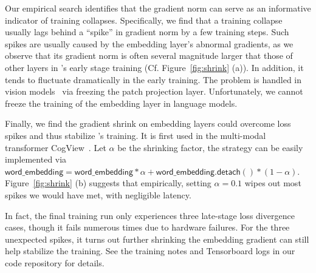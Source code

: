 Our empirical search identifies that the gradient norm can serve as an informative indicator of training collapses. %
Specifically, we find that 
a training collapse usually lags behind a ``spike'' in gradient norm by a few training steps. %
Such spikes are usually caused by the embedding layer's abnormal gradients, as we observe that its gradient norm is often several magnitude larger that those of other layers in \glm's early stage training (Cf. Figure~\ref{fig:shrink} (a)). 
In addition, it tends to fluctuate dramatically in the early training. 
The problem is handled in vision models~\citep{chen2021empirical} via freezing the patch projection layer. 
Unfortunately, we cannot freeze the training of the embedding layer in language models.

Finally, we find the gradient shrink on embedding layers could overcome loss spikes and thus stabilize \glm's training. 
It is first used in the multi-modal transformer CogView~\citep{ding2021cogview}. 
Let $\alpha$ be the shrinking factor, the strategy can be easily implemented via
  $  \mathsf{word\_embedding} = \mathsf{word\_embedding} * \alpha + \mathsf{word\_embedding.detach()} * (1 - \alpha)$. 
Figure~\ref{fig:shrink} (b) suggests that empirically, setting $\alpha=0.1$ wipes out most spikes we would have met, with negligible latency. 

In fact, the final \glm training run only experiences three late-stage loss divergence cases, though it fails numerous times due to hardware failures. 
For the three unexpected spikes, it turns out further shrinking the embedding gradient can still help stabilize the \glm training. 
See the training notes and Tensorboard logs in our code repository
for details. 

